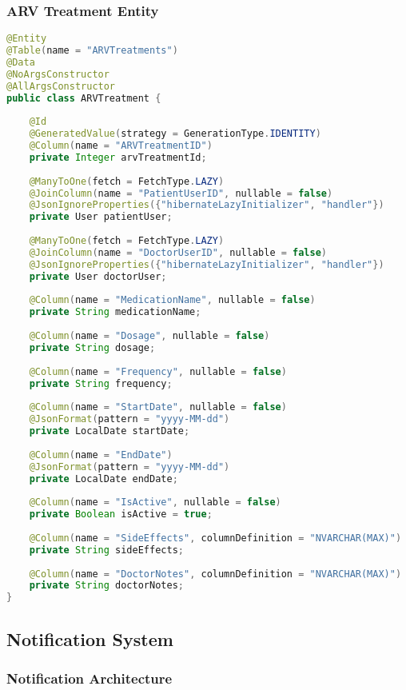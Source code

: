 \documentclass[12pt,a4paper]{article}
\begin{document}
\subsubsection{ARV Treatment Entity}

\begin{lstlisting}[language=Java, caption=ARV Treatment Entity]
@Entity
@Table(name = "ARVTreatments")
@Data
@NoArgsConstructor
@AllArgsConstructor
public class ARVTreatment {
    
    @Id
    @GeneratedValue(strategy = GenerationType.IDENTITY)
    @Column(name = "ARVTreatmentID")
    private Integer arvTreatmentId;
    
    @ManyToOne(fetch = FetchType.LAZY)
    @JoinColumn(name = "PatientUserID", nullable = false)
    @JsonIgnoreProperties({"hibernateLazyInitializer", "handler"})
    private User patientUser;
    
    @ManyToOne(fetch = FetchType.LAZY)
    @JoinColumn(name = "DoctorUserID", nullable = false)
    @JsonIgnoreProperties({"hibernateLazyInitializer", "handler"})
    private User doctorUser;
    
    @Column(name = "MedicationName", nullable = false)
    private String medicationName;
    
    @Column(name = "Dosage", nullable = false)
    private String dosage;
    
    @Column(name = "Frequency", nullable = false)
    private String frequency;
    
    @Column(name = "StartDate", nullable = false)
    @JsonFormat(pattern = "yyyy-MM-dd")
    private LocalDate startDate;
    
    @Column(name = "EndDate")
    @JsonFormat(pattern = "yyyy-MM-dd")
    private LocalDate endDate;
    
    @Column(name = "IsActive", nullable = false)
    private Boolean isActive = true;
    
    @Column(name = "SideEffects", columnDefinition = "NVARCHAR(MAX)")
    private String sideEffects;
    
    @Column(name = "DoctorNotes", columnDefinition = "NVARCHAR(MAX)")
    private String doctorNotes;
}
\end{lstlisting}

\subsection{Notification System}

\subsubsection{Notification Architecture}
\end{document}
